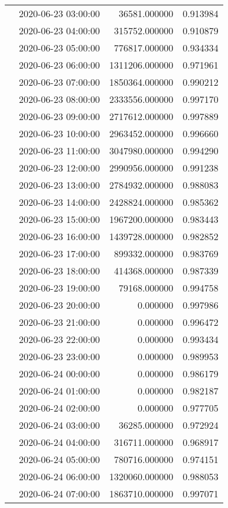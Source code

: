 \begin{tabular}{llrr}
 & 2020-06-23 03:00:00 & 36581.000000 & 0.913984 \\
 & 2020-06-23 04:00:00 & 315752.000000 & 0.910879 \\
 & 2020-06-23 05:00:00 & 776817.000000 & 0.934334 \\
 & 2020-06-23 06:00:00 & 1311206.000000 & 0.971961 \\
 & 2020-06-23 07:00:00 & 1850364.000000 & 0.990212 \\
 & 2020-06-23 08:00:00 & 2333556.000000 & 0.997170 \\
 & 2020-06-23 09:00:00 & 2717612.000000 & 0.997889 \\
 & 2020-06-23 10:00:00 & 2963452.000000 & 0.996660 \\
 & 2020-06-23 11:00:00 & 3047980.000000 & 0.994290 \\
 & 2020-06-23 12:00:00 & 2990956.000000 & 0.991238 \\
 & 2020-06-23 13:00:00 & 2784932.000000 & 0.988083 \\
 & 2020-06-23 14:00:00 & 2428824.000000 & 0.985362 \\
 & 2020-06-23 15:00:00 & 1967200.000000 & 0.983443 \\
 & 2020-06-23 16:00:00 & 1439728.000000 & 0.982852 \\
 & 2020-06-23 17:00:00 & 899332.000000 & 0.983769 \\
 & 2020-06-23 18:00:00 & 414368.000000 & 0.987339 \\
 & 2020-06-23 19:00:00 & 79168.000000 & 0.994758 \\
 & 2020-06-23 20:00:00 & 0.000000 & 0.997986 \\
 & 2020-06-23 21:00:00 & 0.000000 & 0.996472 \\
 & 2020-06-23 22:00:00 & 0.000000 & 0.993434 \\
 & 2020-06-23 23:00:00 & 0.000000 & 0.989953 \\
 & 2020-06-24 00:00:00 & 0.000000 & 0.986179 \\
 & 2020-06-24 01:00:00 & 0.000000 & 0.982187 \\
 & 2020-06-24 02:00:00 & 0.000000 & 0.977705 \\
 & 2020-06-24 03:00:00 & 36285.000000 & 0.972924 \\
 & 2020-06-24 04:00:00 & 316711.000000 & 0.968917 \\
 & 2020-06-24 05:00:00 & 780716.000000 & 0.974151 \\
 & 2020-06-24 06:00:00 & 1320060.000000 & 0.988053 \\
 & 2020-06-24 07:00:00 & 1863710.000000 & 0.997071 \\

\end{tabular}
